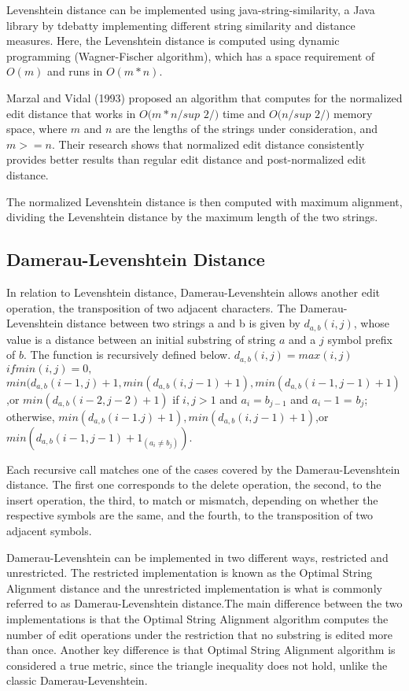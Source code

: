 Levenshtein distance can be implemented using java-string-similarity, a Java library by tdebatty implementing different string similarity and distance measures. Here, the Levenshtein distance is computed using dynamic programming (Wagner-Fischer algorithm), which has a space requirement of $O(m)$ and runs in $O(m*n)$.

Marzal and Vidal (1993) proposed an algorithm that computes for the normalized edit distance that works in $O(m*n/sup$ $2/)$ time and $O(n/sup$ $2/)$ memory space, where $m$ and $n$ are the lengths of the strings under consideration, and $m>=n$. Their research shows that normalized edit distance consistently provides better results than regular edit distance and post-normalized edit distance.

The normalized Levenshtein distance is then computed with maximum alignment, dividing the Levenshtein distance by the maximum length of the two strings. 

\subsection{Damerau-Levenshtein Distance}
In relation to Levenshtein distance, Damerau-Levenshtein allows another edit operation, the transposition of two adjacent characters. The Damerau-Levenshtein distance between two strings a and b is given by $d_{a,b}(i,j)$, whose value is a distance between an initial substring of string $a$ and a $j$ symbol prefix of $b$. The function is recursively defined below.
$d_{a,b}(i,j) = max(i,j)$   $if min(i,j)=0,$ $min(d_{a,b}(i-1,j)+1,min(d_{a,b}(i,j-1)+1),min(d_{a,b}(i-1,j-1)+1)$,or $min(d_{a,b}(i-2,j-2)+1)$   if $i,j>1$ and $a_i = b_{j-1}$ and $a_i - 1$ = $b_j$; otherwise, $min(d_{a,b}(i-1.j)+1),min(d_{a,b}(i,j-1)+1)$,or $min(d_{a,b}(i-1,j-1)+1_{(a_i \neq b_j)})$.

Each recursive call matches one of the cases covered by the Damerau-Levenshtein distance. The first one corresponds to the delete operation, the second, to the insert operation, the third, to match or mismatch, depending on whether the respective symbols are the same, and the fourth, to the transposition of two adjacent symbols.

Damerau-Levenshtein can be implemented in two different ways, restricted and unrestricted. The restricted implementation is known as the Optimal String Alignment distance and the unrestricted implementation is what is commonly referred to as Damerau-Levenshtein distance.The main difference between the two implementations is that the Optimal String Alignment algorithm computes the number of edit operations under the restriction that no substring is edited more than once. Another key difference is that Optimal String Alignment algorithm is considered a true metric, since the triangle inequality does not hold, unlike the classic Damerau-Levenshtein.

